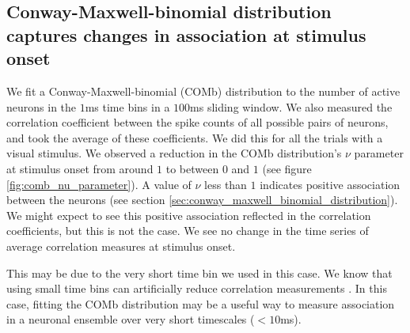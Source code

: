 \documentclass[a4paper,12pt]{article}
\theoremstyle{definition}
\begin{document}
  \newpage

  \subsection{Conway-Maxwell-binomial distribution captures changes in association at stimulus onset}
  We fit a Conway-Maxwell-binomial (COMb) distribution to the number of active neurons in the $1$ms time bins in a $100$ms sliding window. We also measured the correlation coefficient between the spike counts of all possible pairs of neurons, and took the average of these coefficients. We did this for all the trials with a visual stimulus. We observed a reduction in the COMb distribution's $\nu$ parameter at stimulus onset from around $1$ to between $0$ and $1$ (see figure \ref{fig:comb_nu_parameter}). A value of $\nu$ less than $1$ indicates positive association between the neurons (see section \ref{sec:conway_maxwell_binomial_distribution}). We might expect to see this positive association reflected in the correlation coefficients, but this is not the case. We see no change in the time series of average correlation measures at stimulus onset.

  This may be due to the very short time bin we used in this case. We know that using small time bins can artificially reduce correlation measurements \cite{cohen}. In this case, fitting the COMb distribution may be a useful way to measure association in a neuronal ensemble over very short timescales ($<10$ms).

  \newpage
\end{document}
